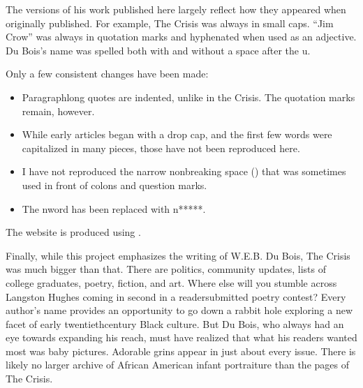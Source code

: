 \documentclass[letterpaper,10pt,english]{jupyterBook}
\begin{document}
\sphinxAtStartPar
The versions of his work published here largely reflect how they appeared when originally published. For example, The Crisis  was always in small caps. “Jim Crow” was always in quotation marks and hyphenated when used as an adjective. Du Bois’s name was spelled both with and without a space after the u.

\sphinxAtStartPar
Only a few consistent changes have been made:
\begin{itemize}
\item {} 
\sphinxAtStartPar
Paragraph\sphinxhyphen{}long quotes are indented, unlike in the Crisis. The quotation marks remain, however.

\item {} 
\sphinxAtStartPar
While early articles began with a drop cap, and the first few words were capitalized in many pieces, those have not been reproduced here.

\item {} 
\sphinxAtStartPar
I have not reproduced the narrow non\sphinxhyphen{}breaking space () that was sometimes used in front of colons and question marks.

\item {} 
\sphinxAtStartPar
The n\sphinxhyphen{}word has been replaced with n*****.

\end{itemize}

\sphinxAtStartPar
The website is produced using .

\sphinxAtStartPar
Finally, while this project emphasizes the writing of W.E.B. Du Bois, The Crisis was much bigger than that. There are politics, community updates, lists of college graduates, poetry, fiction, and art. Where else will you stumble across Langston Hughes coming in second in a reader\sphinxhyphen{}submitted poetry contest? Every author’s name provides an opportunity to go down a rabbit hole exploring a new facet of early twentieth\sphinxhyphen{}century Black culture. But Du Bois, who always had an eye towards expanding his reach, must have realized that what his readers wanted most was baby pictures. Adorable grins appear in just about every issue. There is likely no larger archive of African American infant portraiture than the pages of The Crisis.
\end{document}
